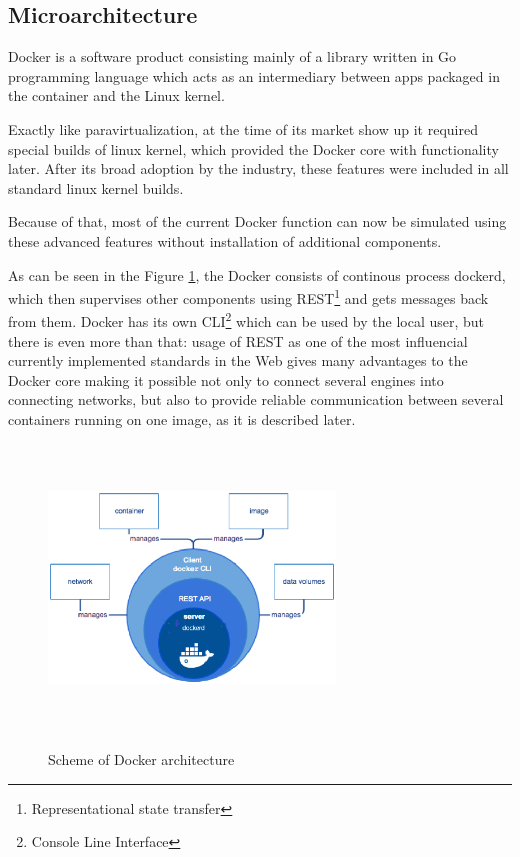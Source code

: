 \subsection{Microarchitecture}

Docker is a software product consisting mainly of a
library written in Go programming language
which acts as an intermediary between apps packaged
in the container and the Linux kernel.

Exactly like paravirtualization, at the time of its market show up
it required special builds of linux kernel, which provided the Docker core with
functionality later. After its broad adoption by the industry, these features
were included in all standard linux kernel builds.

Because of that, most of the current Docker function can now be simulated
using these advanced features without installation of additional components.

As can be seen in the Figure \ref{fig:DockerArch}, the Docker consists
of continous process dockerd, which then supervises other
components using REST\footnote{Representational state transfer}
and gets messages back from them. Docker has its
own CLI\footnote{Console Line Interface} which can be used by the local
user, but there is even more than that:
usage of REST as one of the most influencial currently implemented
standards in the Web gives many advantages to the Docker core making it possible
not only to connect several engines into connecting networks,
but also to provide reliable communication between several containers running on
one image, as it is described later\cite{DockerArch}.

\begin{figure}
\includegraphics[height=3in, width=3in]{dockerarch}
\caption{Scheme of Docker architecture}
\cite{DockerArch}
\label{fig:DockerArch}
\end{figure}

